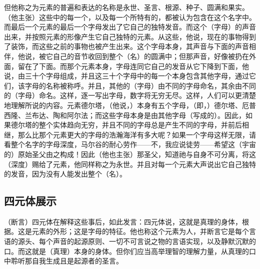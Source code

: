 但他称之为元素的普遍和表达的名称是永世、圣言、根源、种子、圆满和果实。（他主张）这些中的每一个，以及每一个所特有的，都被认为包含在这个名字中。而最后一个元素的最后一个字母发出了它自己的独特发音。而这个（字母）的声音出来，并按照元素的形像产生它自己独特的元素。从这些，他说，现在的事物得到了装饰，而这些之前的事物也被产生出来。这个字母本身，其声音与下面的声音相伴，他说，被它自己的音节收回到整个（名）的圆满中；但那声音，好像被扔在外面，留在了下面。而那个元素本身，字母连同它自己的发音从它下降到下面，他说，由三十个字母组成，并且这三十个字母中的每一个本身包含其他字母，通过它们，该字母的名称被称呼。并且，其他的（字母）由不同的字母命名，其余由不同的（字母）命名。这样，逐一写出字母，数字将无穷无尽。这样，人们可以更清楚地理解所说的内容。元素德尔塔，（他说，）本身有五个字母，（即，）德尔塔、厄普西隆、兰布达、陶和阿尔法；而这些字母本身是由其他字母（写成的）。因此，如果德尔塔的整个实体趋向无穷，并且不同的字母总是产生不同的字母，并前后相继，那么比那个元素更大的字母的浩瀚海洋有多大呢？如果一个字母这样无限，请看整个名字的字母深度，马尔谷的耐心劳作——不，我应说徒劳——希望这（宇宙的）原始圣父由之构成！因此（他也主张）那圣父，知道祂与自身不可分离，将这（深度）赐给了元素，他同样称之为永世。并且对每一个元素大声说出它自己独特的发音，因为没有人能发出整个（名）。\par


\subsection{四元体展示}

（断言）四元体在解释这些事后，如此发言：四元体说，这就是真理的身体，根据。这是元素的外形；这是字母的特征。他也称这个元素为人，并断言它是每个言语的源头、每个声音的起源原则、一切不可言说之物的言语实现，以及静默沉默的口。而这就是（真理）本身的身体。但你们应当高举理智的理解力量，从真理的口中聆听那自我生成且是起源者的圣言。\par

